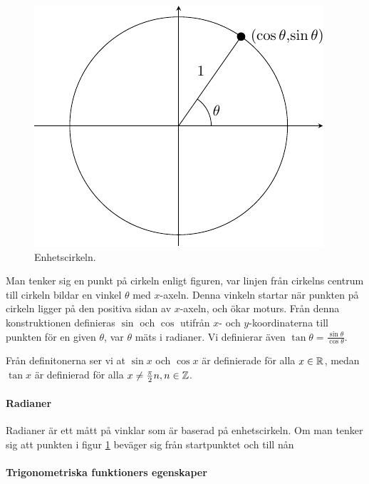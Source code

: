 \begin{figure}[!ht]
	\includegraphics[width=\linewidth]{./Images/unit_circle/unit_circle.pdf}
	\caption{Enhetscirkeln.}
	\label{fig:unit_circle}
\end{figure}

Man tenker sig en punkt på cirkeln enligt figuren, var linjen från cirkelns centrum till cirkeln bildar en vinkel $\theta$ med $x$-axeln. Denna vinkeln startar när punkten på cirkeln ligger på den positiva sidan av $x$-axeln, och ökar moturs. Från denna konstruktionen definieras $\sin$ och $\cos$ utifrån $x$- och $y$-koordinaterna till punkten för en given $\theta$, var $\theta$ mäts i radianer. Vi definierar även $\tan\theta=\frac{\sin\theta}{\cos\theta}$.

Från definitonerna ser vi at $\sin x$ och $\cos x$ är definierade för alla $x\in\mathbb{R}$, medan $\tan x$ är definierad för alla $x\neq \frac{\pi}{2}n, n\in\mathbb{Z}$.

\paragraph{Radianer}

Radianer är ett mått på vinklar som är baserad på enhetscirkeln. Om man tenker sig att punkten i figur \ref{fig:unit_circle} beväger sig från startpunktet och till nån 

\paragraph{Trigonometriska funktioners egenskaper}

